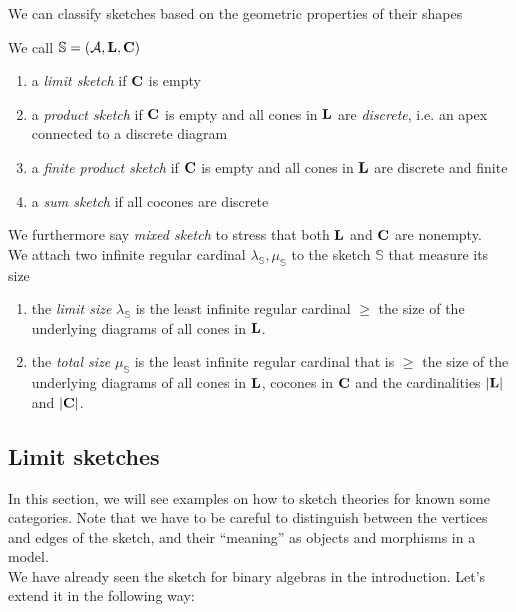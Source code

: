 We can classify sketches based on the geometric properties of their shapes
\begin{Definition}
We call $\mathbb S = (\mathcal{A}, \textbf{L}, \textbf{C})$
\begin{enumerate}
\item a \emph{limit sketch} if $\textbf{C}$ is empty
\item a \emph{product sketch} if $\textbf{C}$ is empty and all cones in $\textbf{L}$ are \emph{discrete}, i.e. an apex connected to a discrete diagram
\item a \emph{finite product sketch} if $\textbf{C}$ is empty and all cones in $\textbf{L}$ are discrete and finite
\item a \emph{sum sketch} if all cocones are discrete
\end{enumerate}
We furthermore say \emph{mixed sketch} to stress that both $\textbf{L}$ and $\textbf{C}$ are nonempty. \\

We attach two infinite regular cardinal $\lambda_\mathbb S, \mu_\mathbb S$ to the sketch $\mathbb S$ that measure its size
\begin{enumerate}
\item the \emph{limit size} $\lambda_\mathbb S$ is the least infinite regular cardinal $\geq$ the size of the underlying diagrams of all cones in $\textbf{L}$.

\item the \emph{total size} $\mu_\mathbb S$ is the least infinite regular cardinal that is $\geq$ the size of the underlying diagrams of all cones in $\textbf{L}$, cocones in $\textbf{C}$ and the cardinalities $|\textbf{L}|$ and $|\textbf{C}|$.
\end{enumerate}
\end{Definition}


\subsection{Limit sketches}

In this section, we will see examples on how to sketch theories for known some categories. Note that we have to be careful to distinguish between the vertices and edges of the sketch, and their ``meaning'' as objects and morphisms in a model. \\

We have already seen the sketch for binary algebras in the introduction. Let's extend it in the following way:

